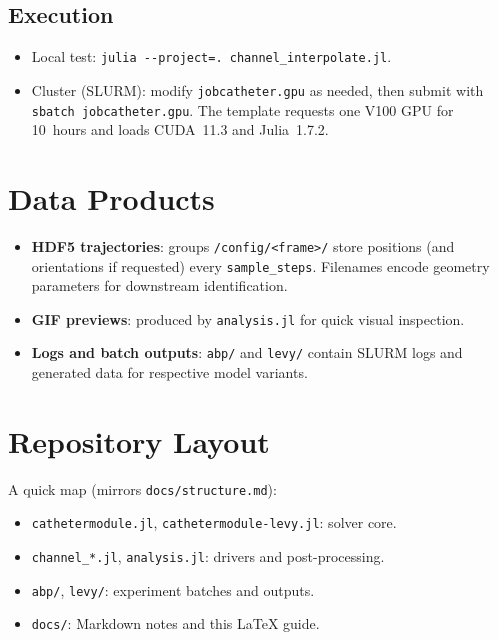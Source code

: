 \documentclass[11pt]{article}
\begin{document}
\subsection{Execution}
\begin{itemize}[leftmargin=*]
  \item Local test: \verb|julia --project=. channel_interpolate.jl|.
  \item Cluster (SLURM): modify \texttt{jobcatheter.gpu} as needed, then submit with \verb|sbatch jobcatheter.gpu|. The template requests one V100 GPU for 10~hours and loads CUDA~11.3 and Julia~1.7.2.
\end{itemize}

\section{Data Products}
\begin{itemize}[leftmargin=*]
  \item \textbf{HDF5 trajectories}: groups \texttt{/config/\textless frame\textgreater/} store positions (and orientations if requested) every \texttt{sample\_steps}. Filenames encode geometry parameters for downstream identification.
  \item \textbf{GIF previews}: produced by \texttt{analysis.jl} for quick visual inspection.
  \item \textbf{Logs and batch outputs}: \texttt{abp/} and \texttt{levy/} contain SLURM logs and generated data for respective model variants.
\end{itemize}

\section{Repository Layout}
A quick map (mirrors \texttt{docs/structure.md}):
\begin{itemize}[leftmargin=*]
  \item \texttt{cathetermodule.jl}, \texttt{cathetermodule-levy.jl}: solver core.
  \item \texttt{channel\_*.jl}, \texttt{analysis.jl}: drivers and post-processing.
  \item \texttt{abp/}, \texttt{levy/}: experiment batches and outputs.
  \item \texttt{docs/}: Markdown notes and this \LaTeX{} guide.
\end{itemize}
\end{document}
